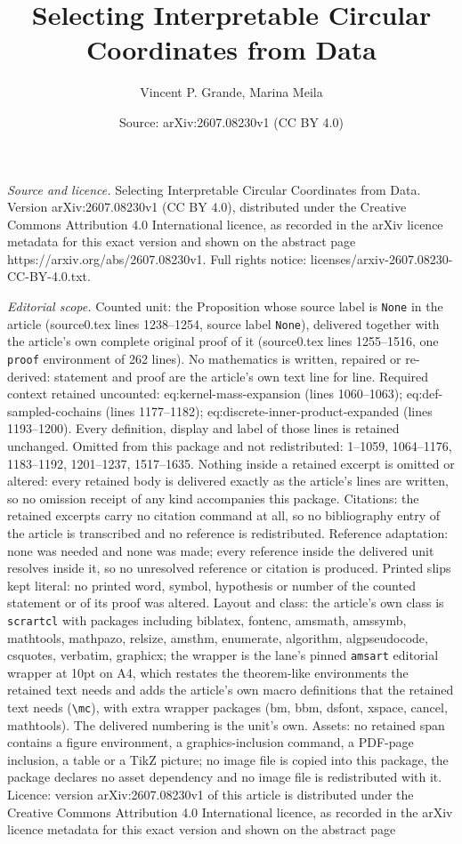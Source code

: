 \documentclass[10pt,a4paper]{amsart}
\title[Selecting Interpretable Circular Coordinates from Data]{Selecting Interpretable Circular Coordinates from Data}
\author{Vincent P. Grande, Marina Meila}
\date{Source: arXiv:2607.08230v1 (CC BY 4.0)}
\begin{document}
\maketitle

\noindent\emph{Source and licence.} Selecting Interpretable Circular Coordinates from Data. Version arXiv:2607.08230v1 (CC BY 4.0), distributed under the Creative Commons Attribution 4.0 International licence, as recorded in the arXiv licence metadata for this exact version and shown on the abstract page https://arxiv.org/abs/2607.08230v1. Full rights notice: licenses/arxiv-2607.08230-CC-BY-4.0.txt.\par\smallskip

\noindent\textit{Editorial scope.} Counted unit: the Proposition whose source label is \texttt{None} in the article (source0.tex lines 1238--1254, source label \texttt{None}), delivered together with the article's own complete original proof of it (source0.tex lines 1255--1516, one \texttt{proof} environment of 262 lines). No mathematics is written, repaired or re-derived: statement and proof are the article's own text line for line. Required context retained uncounted: eq:kernel-mass-expansion (lines 1060--1063); eq:def-sampled-cochains (lines 1177--1182); eq:discrete-inner-product-expanded (lines 1193--1200). Every definition, display and label of those lines is retained unchanged. Omitted from this package and not redistributed: 1--1059, 1064--1176, 1183--1192, 1201--1237, 1517--1635. Nothing inside a retained excerpt is omitted or altered: every retained body is delivered exactly as the article's lines are written, so no omission receipt of any kind accompanies this package. Citations: the retained excerpts carry no citation command at all, so no bibliography entry of the article is transcribed and no reference is redistributed. Reference adaptation: none was needed and none was made; every reference inside the delivered unit resolves inside it, so no unresolved reference or citation is produced. Printed slips kept literal: no printed word, symbol, hypothesis or number of the counted statement or of its proof was altered. Layout and class: the article's own class is \texttt{scrartcl} with packages including biblatex, fontenc, amsmath, amssymb, mathtools, mathpazo, relsize, amsthm, enumerate, algorithm, algpseudocode, csquotes, verbatim, graphicx; the wrapper is the lane's pinned \texttt{amsart} editorial wrapper at 10pt on A4, which restates the theorem-like environments the retained text needs and adds the article's own macro definitions that the retained text needs (\texttt{\textbackslash mc}), with extra wrapper packages (bm, bbm, dsfont, xspace, cancel, mathtools). The delivered numbering is the unit's own. Assets: no retained span contains a figure environment, a graphics-inclusion command, a PDF-page inclusion, a table or a TikZ picture; no image file is copied into this package, the package declares no asset dependency and no image file is redistributed with it. Licence: version arXiv:2607.08230v1 of this article is distributed under the Creative Commons Attribution 4.0 International licence, as recorded in the arXiv licence metadata for this exact version and shown on the abstract page 
\end{document}
